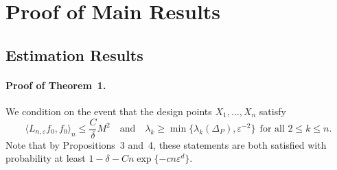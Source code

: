 \documentclass[aos]{imsart}
\theoremstyle{plain}
\theoremstyle{definition}
\theoremstyle{remark}
\newcommand{\dotp}[2]{\langle #1, #2 \rangle}
\newcommand{\1}{\mathbf{1}}
\begin{document}
\section{Proof of Main Results}
\label{sec:proofs_main_results}

\subsection{Estimation Results}

\paragraph{Proof of Theorem~1.}
We condition on the event that the design points $X_1,\ldots,X_n$ satisfy
\begin{equation}
\label{pf:laplacian_eigenmaps_estimation_fo_1}
\dotp{L_{n,\varepsilon}f_0}{f_0}_n \leq \frac{C}{\delta}M^2 \quad \textrm{and} \quad \lambda_k \geq \min\{\lambda_k(\Delta_P), \varepsilon^{-2}\}~~\textrm{for all $2 \leq k \leq n$.}
\end{equation}
Note that by Propositions~3 and~4, these statements are both satisfied with probability at least $1 - \delta - Cn\exp\{-cn\varepsilon^d\}$. 
\end{document}
